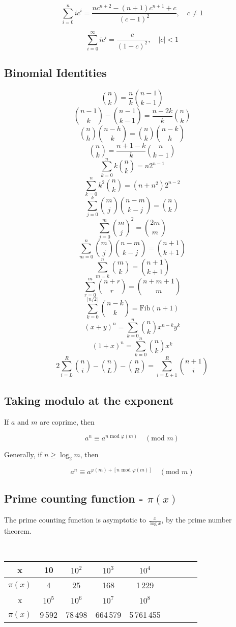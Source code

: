 \documentclass[12pt, a4paper, twoside]{article}
\begin{document}
$$\sum_{i=0}^{n} ic^{i} = \frac{nc^{n+2} - (n+1)c^{n+1} + c}{(c-1)^{2}}, \quad c \neq 1$$

$$\sum_{i=0}^{\infty} ic^{i} = \frac{c}{(1-c)^{2}}, \quad |c| < 1$$

\subsection{Binomial Identities}

$$
\binom{n}{k} = \frac{n}{k}\binom{n-1}{k-1}
$$
$$
\binom{n-1}{k} - \binom{n-1}{k-1} = \frac{n - 2k}{k} \binom{n}{k}
$$
$$
\binom{n}{h}\binom{n-h}{k} = \binom{n}{k}\binom{n-k}{h}
$$
$$
\binom{n}{k} = \frac{n+1-k}{k} \binom{n}{k-1}
$$
$$
\sum_{k = 0}^n k\binom{n}{k} = n 2^{n-1}
$$
$$
\sum_{k = 0}^n k^2 \binom{n}{k} = (n + n^2)2^{n-2}
$$
$$
\sum_{j = 0}^k\binom{m}{j} \binom{n-m}{k-j} = \binom{n}{k}
$$
$$
\sum_{j = 0}^m \binom{m}{j}^2 = \binom{2m}{m}
$$
$$
\sum_{m = 0}^n \binom{m}{j} \binom{n-m}{k-j} = \binom{n+1}{k+1}
$$
$$
\sum_{m = k}^n \binom{m}{k} = \binom{n+1}{k+1}
$$
$$
\sum_{r = 0}^m \binom{n+r}{r} = \binom{n+m+1}{m}
$$
$$
\sum_{k=0}^{\lfloor n/2 \rfloor} \binom{n-k}{k} = \text{Fib}(n+1)
$$
$$
(x + y)^{n} = \sum_{k=0}^{n} \binom{n}{k} x^{n-k} y^{k}
$$
$$
(1 + x)^{n} = \sum_{k=0}^{n} \binom{n}{k} x^{k}
$$
$$
2\sum_{i = L}^R \binom{n}{i} - \binom{n}{L} - \binom{n}{R} = \sum_{i = L+1}^R \binom{n+1}{i}
$$

\subsection{Taking modulo at the exponent}

If $a$ and $m$ are coprime, then

$$ a^n \equiv a^{n \text{ mod } \varphi(m)} \quad (\text{mod } m) $$

Generally, if $n \geq \log_2 m$, then

$$ a^n \equiv a^{\varphi(m) + [n \text{ mod } \varphi(m)]} \quad (\text{mod } m) $$

\subsection{Prime counting function - \texorpdfstring{$\pi(x)$}{}} The prime counting function is asymptotic to $\frac{x}{\log x}$, by the prime number theorem.

\

\begin{tabular}{|c|c|c|c|c|c|c|c|c|}
\hline
  x&10&$10^2$&$10^3$&$10^4$\\ \hline
  $\pi(x)$& 4 & 25 & 168 & 1\,229 \\ \hline
  x&$10^5$&$10^6$&$10^7$&$10^8$\\ \hline
  $\pi(x)$& 9\,592 & 78\,498 & 664\,579 & 5\,761\,455\\ \hline
\end{tabular}
\end{document}
